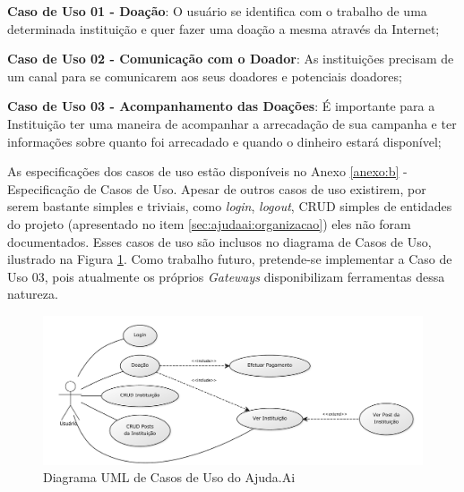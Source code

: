\begin{lista}
  \item \textbf{Caso de Uso 01 - Doação}: O usuário se identifica com o trabalho de uma determinada instituição e quer fazer uma doação a mesma através da Internet;
  \item \textbf{Caso de Uso 02 - Comunicação com o Doador}: As instituições precisam de um canal para se comunicarem aos seus doadores e potenciais doadores;
  \item \textbf{Caso de Uso 03 - Acompanhamento das Doações}: É importante para a Instituição ter uma maneira de acompanhar a arrecadação de sua campanha e ter informações sobre quanto foi arrecadado e quando o dinheiro estará disponível;
\end{lista}

As especificações dos casos de uso estão disponíveis no Anexo \ref{anexo:b} - Especificação de Casos de Uso. Apesar de outros casos de uso existirem, por serem bastante simples e triviais, como \emph{login}, \emph{logout}, CRUD simples de entidades do projeto  (apresentado no item \ref{sec:ajudaai:organizacao}) eles não foram documentados. Esses casos de uso são inclusos no diagrama de Casos de Uso, ilustrado na Figura \ref{fig:uml_caso_uso}. Como trabalho futuro, pretende-se implementar a Caso de Uso 03, pois atualmente os próprios \emph{Gateways} disponibilizam ferramentas dessa natureza.

\begin{figure}[H]
  \caption{\label{fig:uml_caso_uso}Diagrama UML de Casos de Uso do Ajuda.Ai}
  \centering
  \includegraphics[scale=0.4]{imagens/uml-casos-de-uso-02.pdf}
\end{figure}

